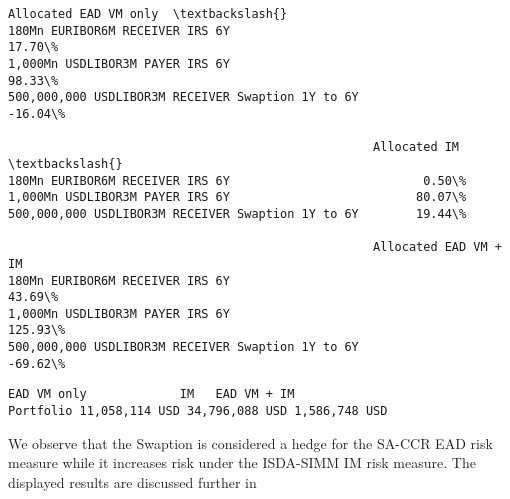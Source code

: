             \begin{tcolorbox}[breakable, size=fbox, boxrule=.5pt, pad at break*=1mm, opacityfill=0]
\begin{Verbatim}[commandchars=\\\{\}]
                                                   Allocated EAD VM only  \textbackslash{}
180Mn EURIBOR6M RECEIVER IRS 6Y                                   17.70\%
1,000Mn USDLIBOR3M PAYER IRS 6Y                                   98.33\%
500,000,000 USDLIBOR3M RECEIVER Swaption 1Y to 6Y                -16.04\%

                                                   Allocated IM  \textbackslash{}
180Mn EURIBOR6M RECEIVER IRS 6Y                           0.50\%
1,000Mn USDLIBOR3M PAYER IRS 6Y                          80.07\%
500,000,000 USDLIBOR3M RECEIVER Swaption 1Y to 6Y        19.44\%

                                                   Allocated EAD VM + IM
180Mn EURIBOR6M RECEIVER IRS 6Y                                   43.69\%
1,000Mn USDLIBOR3M PAYER IRS 6Y                                  125.93\%
500,000,000 USDLIBOR3M RECEIVER Swaption 1Y to 6Y                -69.62\%
\end{Verbatim}
\end{tcolorbox}
        
            \begin{tcolorbox}[breakable, size=fbox, boxrule=.5pt, pad at break*=1mm, opacityfill=0]
\begin{Verbatim}[commandchars=\\\{\}]
             EAD VM only             IM   EAD VM + IM
Portfolio 11,058,114 USD 34,796,088 USD 1,586,748 USD
\end{Verbatim}
\end{tcolorbox}
        
    We observe that the Swaption is considered a hedge for the SA-CCR EAD
risk measure while it increases risk under the ISDA-SIMM IM risk
measure. The displayed results are discussed further in


